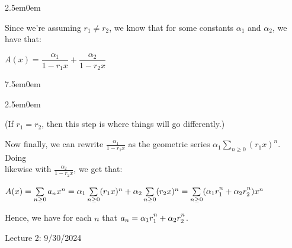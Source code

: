 \documentclass{book}
\newcommand{\teachComment}{
   \color{Orange}%
   \fontsize{12}{14}\selectfont%
}
\newenvironment{myIndent}{%
   \begin{adjustwidth}{2.5em}{0em}%
}{%
   \end{adjustwidth}%
}
\newenvironment{myTindent}{%
   \begin{adjustwidth}{7.5em}{0em}%
}{%
   \end{adjustwidth}%
}
\newcommand{\retTwo}{\hfill\bigbreak}
\newcommand{\mHeader}[1]{{
   \color{Black}%
   \fontsize{20}{18}\selectfont%
   #1\retTwo
}}
\begin{document}
\begin{myIndent}
   Since we're assuming $r_1 \neq r_2$, we know that for some constants $\alpha_1$ and $\alpha_2$, we have that:

   {\centering $A(x) = \dfrac{\alpha_1}{1 - r_1x} + \dfrac{\alpha_2}{1 - r_2x} $ \retTwo\par}

   
   \begin{myTindent}\begin{myIndent}\teachComment
      (If $r_1 = r_2$, then this step is where things will go differently.)\retTwo
   \end{myIndent}\end{myTindent}

   Now finally, we can rewrite $\frac{\alpha_1}{1 - r_1x}$ as the geometric series $\alpha_1 \sum\limits_{n \geq 0}(r_1x)^n$. Doing\\ [-6pt] likewise with $\frac{\alpha_2}{1 - r_2x}$, we get that:

   {\center $A(x) = \sum\limits_{n \geq 0} a_n x^n = \alpha_1 \sum\limits_{n \geq 0}(r_1x)^n + \alpha_2 \sum\limits_{n \geq 0}(r_2x)^n = \sum\limits_{n \geq 0}(\alpha_1r_1^{\vphantom{|}n} + \alpha_2r_2^{\vphantom{|}n})x^n$ \retTwo\par}

   Hence, we have for each $n$ that $a_n = \alpha_1r_1^{\vphantom{|}n} + \alpha_2r_2^{\vphantom{|}n}$.
\end{myIndent}

\newpage

\mHeader{Lecture 2: 9/30/2024}
\end{document}
